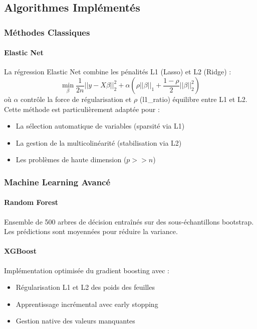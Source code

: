 \documentclass[11pt,a4paper]{article}
\begin{document}
\subsection{Algorithmes Implémentés}

\subsubsection{Méthodes Classiques}

\paragraph{Elastic Net}
La régression Elastic Net combine les pénalités L1 (Lasso) et L2 (Ridge) :
\begin{equation}
\min_{\beta} \frac{1}{2n} ||y - X\beta||_2^2 + \alpha \left( \rho ||\beta||_1 + \frac{1-\rho}{2} ||\beta||_2^2 \right)
\end{equation}
où $\alpha$ contrôle la force de régularisation et $\rho$ (l1\_ratio) équilibre entre L1 et L2.
Cette méthode est particulièrement adaptée pour :
\begin{itemize}
    \item La sélection automatique de variables (sparsité via L1)
    \item La gestion de la multicolinéarité (stabilisation via L2)
    \item Les problèmes de haute dimension ($p >> n$)
\end{itemize}

\subsubsection{Machine Learning Avancé}

\paragraph{Random Forest}
Ensemble de 500 arbres de décision entraînés sur des sous-échantillons bootstrap. 
Les prédictions sont moyennées pour réduire la variance.

\paragraph{XGBoost}
Implémentation optimisée du gradient boosting avec :
\begin{itemize}
    \item Régularisation L1 et L2 des poids des feuilles
    \item Apprentissage incrémental avec early stopping
    \item Gestion native des valeurs manquantes
\end{itemize}
\end{document}
